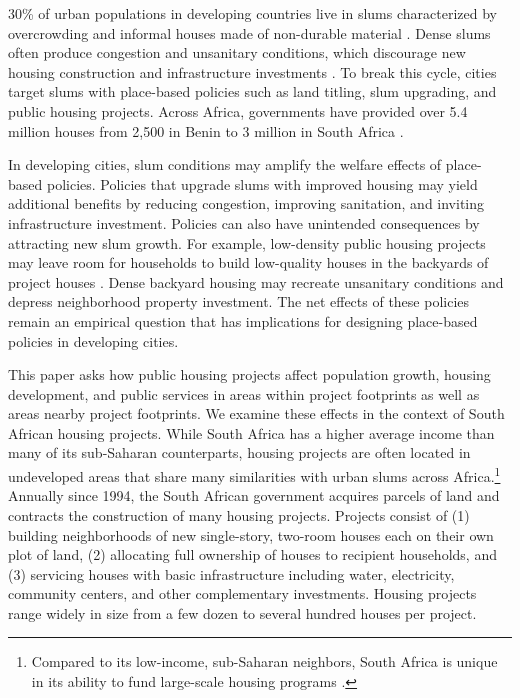 \documentclass[12pt]{article}
\newcommand{\rv}{}
\begin{document}
30\% of urban populations in developing countries live in slums characterized by overcrowding and informal houses made of non-durable material \citep{mdg}.  Dense slums often produce congestion and unsanitary conditions, which discourage new housing construction and infrastructure investments \citep{marx2013slums}.  To break this cycle, cities target slums with place-based policies such as land titling, slum upgrading, and public housing projects.  Across Africa, governments have provided over 5.4 million houses from 2,500 in Benin to 3 million in South Africa \citep{bah2018housing}.  

In developing cities, slum conditions may amplify the welfare effects of place-based policies.  Policies that upgrade slums with improved housing may yield additional benefits by reducing congestion, improving sanitation, and inviting infrastructure investment.  Policies can also have unintended consequences by attracting new slum growth.  For example, low-density public housing projects may leave room for households to build low-quality houses in the backyards of project houses \citep{Brueckner2018backyarding}.  Dense backyard housing may recreate unsanitary conditions and depress neighborhood property investment.  The net effects of these policies remain an empirical question that has implications for designing place-based policies in developing cities.

This paper asks how public housing projects affect population growth, housing development, and public services in areas within project footprints as well as areas nearby project footprints.  \rv{We examine these effects in the context of South African housing projects.  While South Africa has a higher average income than many of its sub-Saharan counterparts, housing projects are often located in undeveloped areas that share many similarities with urban slums across Africa.\footnote{\rv{Compared to its low-income, sub-Saharan neighbors, South Africa is unique in its ability to fund large-scale housing programs \citep{bah2018housing}.}}  Annually since 1994, the South African government acquires parcels of land and contracts the construction of many housing projects.  Projects consist of (1) building neighborhoods of new single-story, two-room houses each on their own plot of land, (2) allocating full ownership of houses to recipient households, and (3) servicing houses with basic infrastructure including water, electricity, community centers, and other complementary investments.  Housing projects range widely in size from a few dozen to several hundred houses per project.}
\end{document}
